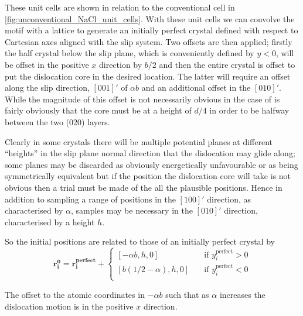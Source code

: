 These unit cells are shown in relation to the conventional cell in \autoref{fig:unconventional_NaCl_unit_cells}. With these unit cells we can convolve the motif with a lattice to generate an initially perfect crystal defined with respect to Cartesian axes aligned with the slip system. Two offsets are then applied; firstly the half crystal below the slip plane, which is conveniently defined by $y < 0$, will be offset in the positive $x$ direction by $b/2$ and then the entire crystal is offset to put the dislocation core in the desired location. The latter will require an offset along the slip direction, $[001]'$ of $\alpha b$ and an additional offset in the $[010]'$. While the magnitude of this offset is not necessarily obvious in the case of  is fairly obviously that the core must be at a height of $d/4$ in order to be halfway between the two (020) layers.


Clearly in some crystals there will be multiple potential planes at different ``heights'' in the slip plane normal direction that the dislocation may glide along; some planes may be discarded as obviously energetically unfavourable or as being symmetrically equivalent but if the position the dislocation core will take is not obvious then a trial must be made of the all the plausible positions. Hence in addition to sampling a range of positions in the $[100]'$ direction, as characterised by $\alpha$, samples may be necessary in the $[010]'$ direction, characterised by a height $h$.

So the initial positions are related to those of an initially perfect crystal by
\begin{equation}
\bm{r_i^0} = \bm{r_i^{\text{perfect}}} +\begin{cases}
[-\alpha{}b, h, 0] & \quad \text{if } y_i^{\text{perfect}} > 0\\
[b(1/2 - \alpha{}), h, 0] & \quad \text{if } y_i^{\text{perfect}} < 0\\
\end{cases} 
\end{equation}

The offset to the atomic coordinates in $-\alpha{}b$ such that as $\alpha$ increases the dislocation motion is in the positive $x$ direction.





\FloatBarrier












